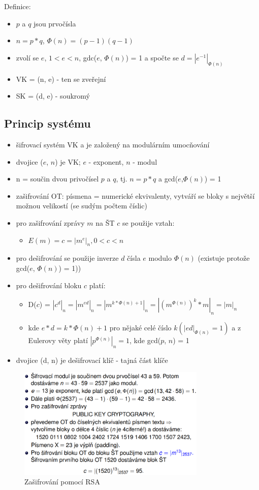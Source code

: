 \documentclass{szzclass}
\begin{document}
Definice:
\begin{itemize}
    \item $p$ a $q$ jsou prvočísla
    \item $n = p*q$, $\Phi(n) = (p - 1)(q - 1)$
    \item zvolí se $e$, $1 < e < n$, gdc($e$, $\Phi(n)$) = 1 a spočte se $d = |e^{-1}|_{\Phi(n)}$
    \item VK = (n, e) - ten se zveřejní
    \item SK = (d, e) - soukromý
\end{itemize}
\subsection{Princip systému}
\begin{itemize}
    \item šifrovací systém VK a je založený na modulárním umocňování
    \item dvojice ($e$, $n$) je VK; $e$ - exponent, $n$ - modul
    \item n = součin dvou privočísel $p$ a $q$, tj. $n = p*q$ a gcd($e$,$\Phi(n)$) = 1
    \item zašifrování OT: písmena = numerické ekvivalenty, vytváří se bloky s největší možnou velikostí (se sudým počtem číslic)
    \item pro zašifrování zprávy $m$ na ŠT $c$ se použije vztah:
    \begin{itemize}
        \item $E(m) = c = |m^e|_n, 0 < c < n$
    \end{itemize}
    \item pro dešifrování se použije inverze $d$ čísla $e$ modulo $\Phi(n)$ (existuje protože gcd($e$, $\Phi(n)$) = 1))
    \item pro dešifrování bloku $c$ platí:
    \begin{itemize}
        \item D($c$) = $|c^d|_n = |m^{ed}|_n = |m^{k*\Phi(n)+1}|_n = |(m^{\Phi(n)})^k*m|_n = |m|_n$
        \item kde $e*d = k*\Phi(n) + 1$ pro nějaké celé číslo $k (|ed|_{\Phi(n)} = 1)$ a z Eulerovy věty platí $|p^{\Phi(n)}|_n = 1$, kde gcd($p$, $n$) = 1
    \end{itemize}
    \item dvojice (d, n) je dešifrovací klíč - tajná část klíče
\end{itemize}
\begin{figure}[h!]
    \centering
    \includegraphics[width=0.8\textwidth]{topics/bi-spol-06/image/rsaEncrypt.png}
    \caption{Zašifrování pomocí RSA}
\end{figure}
\end{document}
